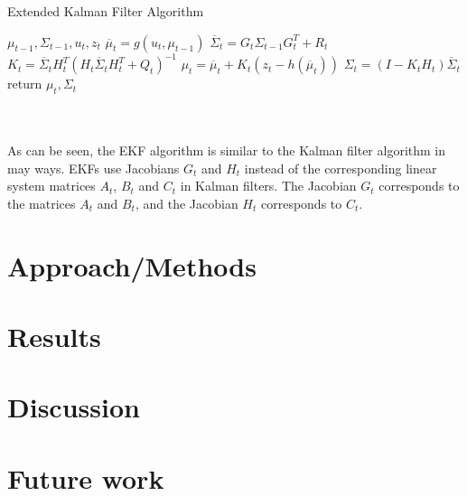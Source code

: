 \documentclass[conference]{IEEEtran}
\begin{document}
\begin{minipage}{\linewidth}
  \begin{algorithm}[H]
    \caption{Extended Kalman Filter Algorithm}\label{AlgEkf}
    \begin{algorithmic}[1]
       {$\mu_{t-1},\Sigma_{t-1}, u_t,z_t$}
	\State $\overline \mu_t = g(u_t, \mu_{t-1})$
	\State $\overline \Sigma_t= G_t \Sigma_{t-1} G_t^T + R_t$  
	\State $K_t = \overline \Sigma_t H_t^T{(H_t \overline \Sigma_t H_t^T + Q_t)}^{-1}$
	\State $\mu_t = \overline \mu_t + K_t(z_t - h(\overline \mu_t))$
	\State $\Sigma_t = (I - K_t H_t) \overline \Sigma_t$
	\State return $\mu_t, \Sigma_t$
      \EndProcedure
    \end{algorithmic}
  \end{algorithm}
\end{minipage}\\\\

As can be seen, the EKF algorithm is similar to the Kalman filter algorithm in may ways. EKFs use Jacobians $G_t$ and $H_t$ instead of the corresponding linear system matrices $A_t$, $B_t$ and $C_t$ in Kalman filters. The Jacobian $G_t$ corresponds to the matrices $A_t$ and $B_t$, and the Jacobian $H_t$ corresponds to $C_t$.
\section{Approach/Methods}
\section{Results}
\section{Discussion}
\section{Future work}
%
%
\end{document}

